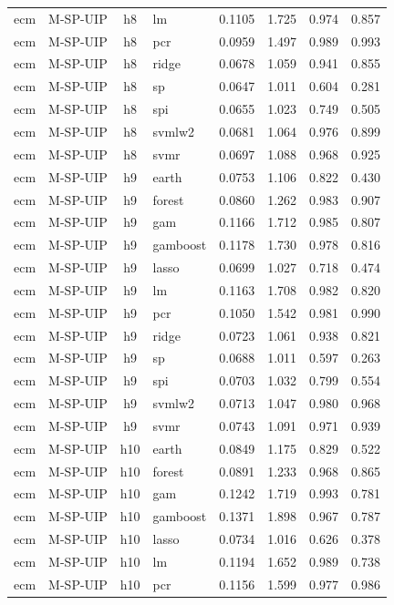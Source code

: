 \begin{ThreePartTable}
\begin{longtable}[t]{llclcccc}
ecm & M-SP-UIP & h8 & lm & 0.1105 & 1.725 & 0.974 & 0.857\\
ecm & M-SP-UIP & h8 & pcr & 0.0959 & 1.497 & 0.989 & 0.993\\
ecm & M-SP-UIP & h8 & ridge & 0.0678 & 1.059 & 0.941 & 0.855\\
ecm & M-SP-UIP & h8 & sp & 0.0647 & 1.011 & 0.604 & 0.281\\
ecm & M-SP-UIP & h8 & spi & 0.0655 & 1.023 & 0.749 & 0.505\\
ecm & M-SP-UIP & h8 & svmlw2 & 0.0681 & 1.064 & 0.976 & 0.899\\
ecm & M-SP-UIP & h8 & svmr & 0.0697 & 1.088 & 0.968 & 0.925\\
\addlinespace
ecm & M-SP-UIP & h9 & earth & 0.0753 & 1.106 & 0.822 & 0.430\\
ecm & M-SP-UIP & h9 & forest & 0.0860 & 1.262 & 0.983 & 0.907\\
ecm & M-SP-UIP & h9 & gam & 0.1166 & 1.712 & 0.985 & 0.807\\
ecm & M-SP-UIP & h9 & gamboost & 0.1178 & 1.730 & 0.978 & 0.816\\
ecm & M-SP-UIP & h9 & lasso & 0.0699 & 1.027 & 0.718 & 0.474\\
ecm & M-SP-UIP & h9 & lm & 0.1163 & 1.708 & 0.982 & 0.820\\
ecm & M-SP-UIP & h9 & pcr & 0.1050 & 1.542 & 0.981 & 0.990\\
ecm & M-SP-UIP & h9 & ridge & 0.0723 & 1.061 & 0.938 & 0.821\\
ecm & M-SP-UIP & h9 & sp & 0.0688 & 1.011 & 0.597 & 0.263\\
ecm & M-SP-UIP & h9 & spi & 0.0703 & 1.032 & 0.799 & 0.554\\
ecm & M-SP-UIP & h9 & svmlw2 & 0.0713 & 1.047 & 0.980 & 0.968\\
ecm & M-SP-UIP & h9 & svmr & 0.0743 & 1.091 & 0.971 & 0.939\\
\addlinespace
ecm & M-SP-UIP & h10 & earth & 0.0849 & 1.175 & 0.829 & 0.522\\
ecm & M-SP-UIP & h10 & forest & 0.0891 & 1.233 & 0.968 & 0.865\\
ecm & M-SP-UIP & h10 & gam & 0.1242 & 1.719 & 0.993 & 0.781\\
ecm & M-SP-UIP & h10 & gamboost & 0.1371 & 1.898 & 0.967 & 0.787\\
ecm & M-SP-UIP & h10 & lasso & 0.0734 & 1.016 & 0.626 & 0.378\\
ecm & M-SP-UIP & h10 & lm & 0.1194 & 1.652 & 0.989 & 0.738\\
ecm & M-SP-UIP & h10 & pcr & 0.1156 & 1.599 & 0.977 & 0.986\\

\end{longtable}
\end{ThreePartTable}
